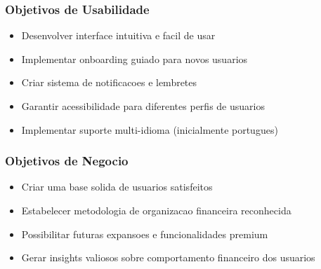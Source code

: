 \subsubsection{Objetivos de Usabilidade}
\begin{itemize}
    \item Desenvolver interface intuitiva e facil de usar
    \item Implementar onboarding guiado para novos usuarios
    \item Criar sistema de notificacoes e lembretes
    \item Garantir acessibilidade para diferentes perfis de usuarios
    \item Implementar suporte multi-idioma (inicialmente portugues)
\end{itemize}

\subsubsection{Objetivos de Negocio}
\begin{itemize}
    \item Criar uma base solida de usuarios satisfeitos
    \item Estabelecer metodologia de organizacao financeira reconhecida
    \item Possibilitar futuras expansoes e funcionalidades premium
    \item Gerar insights valiosos sobre comportamento financeiro dos usuarios
\end{itemize}
